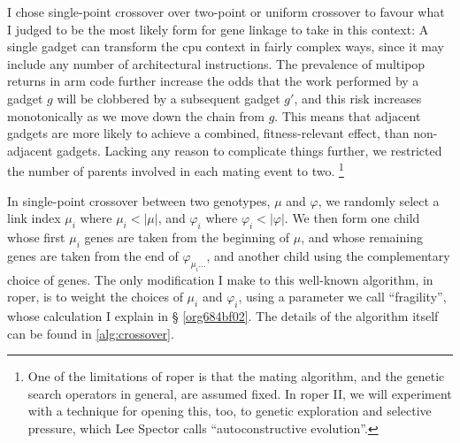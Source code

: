\documentclass[12pt,glossary]{dalthesis}
\begin{document}
I chose single-point crossover over two-point or uniform crossover to favour
what I judged to be the most likely form for gene linkage to take in this
context: A single gadget can transform the \gls{cpu} context in fairly complex
ways, since it may include any number of architectural instructions. The
prevalence of multipop returns in \gls{arm} code further increase the odds that
the work performed by a gadget \(g\) will be clobbered by a subsequent gadget
\(g'\), and this risk increases monotonically as we move down the chain from \(g\).
This means that adjacent gadgets are more likely to achieve a combined,
fitness-relevant effect, than non-adjacent gadgets. Lacking any reason to
complicate things further, we restricted the number of parents involved in each
mating event to two. \footnote{One of the limitations of \gls{roper} is that the mating
algorithm, and the genetic search operators in general, are assumed fixed. In
\gls{roper} II, we will experiment with a technique for opening this, too, to
genetic exploration and selective pressure, which Lee Spector calls
``autoconstructive evolution''.}


In single-point crossover between two genotypes, \(\mu\) and \(\varphi\), we
randomly select a link index \(\mu_i\) where \(\mu_i < |\mu|\), and \(\varphi_i\)
where \(\varphi_i < |\varphi|\). We then form one child whose first \(\mu_i\) genes
are taken from the beginning of \(\mu\), and whose remaining genes are taken from
the end of \(\varphi_{\mu_i\dots}\), and another child using the complementary
choice of genes. The only modification I make to this well-known algorithm, in
\gls{roper}, is to weight the choices of \(\mu_i\) and \(\varphi_i\), using a
parameter we call ``fragility'', whose calculation I explain in \S
\ref{org684bf02}. The details of the algorithm itself can be found in
\ref{alg:crossover}.
\end{document}
